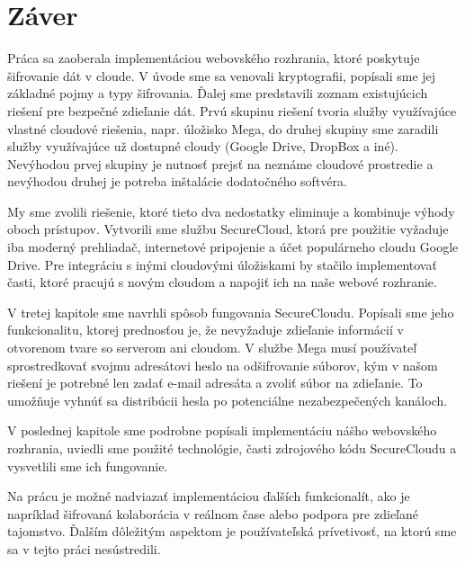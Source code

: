 \chapter*{Záver}


Práca sa zaoberala implementáciou webovského rozhrania, ktoré poskytuje šifrovanie dát v cloude. 
V úvode sme sa venovali kryptografii, popísali sme jej základné pojmy a typy šifrovania. Ďalej sme predstavili 
zoznam existujúcich riešení pre bezpečné zdieľanie dát. Prvú skupinu riešení tvoria služby využívajúce vlastné cloudové riešenia, 
napr. úložisko Mega, do druhej skupiny sme zaradili služby využívajúce už dostupné cloudy (Google Drive, DropBox a iné).
Nevýhodou prvej skupiny je nutnosť prejsť na neznáme cloudové prostredie a nevýhodou druhej je potreba inštalácie dodatočného softvéra. 

My sme zvolili riešenie, ktoré tieto dva nedostatky eliminuje a kombinuje výhody oboch prístupov. Vytvorili sme službu SecureCloud, 
ktorá pre použitie vyžaduje iba
moderný prehliadač, internetové pripojenie a účet populárneho cloudu Google Drive. Pre integráciu s inými cloudovými úložiskami 
by stačilo implementovať časti, ktoré pracujú s novým cloudom a napojiť ich na naše webové rozhranie. 

V tretej kapitole sme navrhli spôsob fungovania SecureCloudu. Popísali sme jeho funkcionalitu, 
ktorej prednosťou je, že nevyžaduje zdieľanie informácií v otvorenom tvare so serverom ani cloudom. V službe Mega musí používateľ sprostredkovať 
svojmu adresátovi heslo na odšifrovanie súborov, kým v našom riešení je potrebné len zadať e-mail adresáta a zvoliť súbor na zdieľanie. To umožňuje
vyhnúť sa distribúcii hesla po potenciálne nezabezpečených kanáloch.

V poslednej kapitole sme podrobne popísali implementáciu nášho webovského rozhrania, uviedli sme použité technológie, 
časti zdrojového kódu SecureCloudu a vysvetlili sme ich fungovanie.

Na prácu je možné nadviazať implementáciou ďalších funkcionalít, ako je napríklad šifrovaná kolaborácia v reálnom
čase alebo podpora pre zdieľané tajomstvo. Ďalším dôležitým aspektom je používateľská prívetivosť, na ktorú sme 
sa v tejto práci nesústredili. 